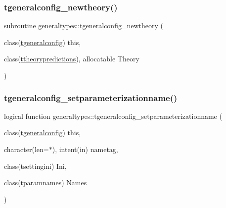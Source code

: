 \subsubsection{\texorpdfstring{tgeneralconfig\+\_\+newtheory()}{tgeneralconfig\_newtheory()}}
{\footnotesize\ttfamily subroutine generaltypes\+::tgeneralconfig\+\_\+newtheory (\begin{DoxyParamCaption}\item[{class(\mbox{\hyperlink{structgeneraltypes_1_1tgeneralconfig}{tgeneralconfig}})}]{this,  }\item[{class(\mbox{\hyperlink{structgeneraltypes_1_1ttheorypredictions}{ttheorypredictions}}), allocatable}]{Theory }\end{DoxyParamCaption})\hspace{0.3cm}{\ttfamily [private]}}

\mbox{\label{namespacegeneraltypes_a86a26412494e782acd18ef23abfc46b4}} 
\subsubsection{\texorpdfstring{tgeneralconfig\+\_\+setparameterizationname()}{tgeneralconfig\_setparameterizationname()}}
{\footnotesize\ttfamily logical function generaltypes\+::tgeneralconfig\+\_\+setparameterizationname (\begin{DoxyParamCaption}\item[{class(\mbox{\hyperlink{structgeneraltypes_1_1tgeneralconfig}{tgeneralconfig}})}]{this,  }\item[{character(len=$\ast$), intent(in)}]{nametag,  }\item[{class(tsettingini)}]{Ini,  }\item[{class(tparamnames)}]{Names }\end{DoxyParamCaption})\hspace{0.3cm}{\ttfamily [private]}}

\mbox{\label{namespacegeneraltypes_a9ebf4d67be70717d4385bd575cc2300f}} 
